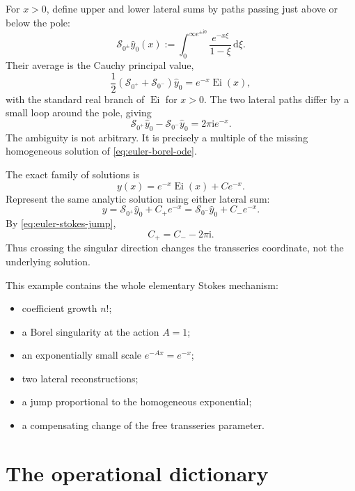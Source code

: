 \documentclass[11pt,openany]{book}
\theoremstyle{definition}
\theoremstyle{plain}
\theoremstyle{remark}
\newcommand{\dd}{\,\mathrm{d}}
\newcommand{\ii}{\mathrm{i}}
\newcommand{\trans}[1]{\widehat{#1}}
\DeclareMathOperator{\Ei}{Ei}
\newcommand{\lateralsum}[1]{\mathcal{S}_{#1}}
\begin{document}
For $x>0$, define upper and lower lateral sums by paths passing just above or below the pole:
\begin{equation}\label{eq:euler-lateral-sums}
 \lateralsum{0^\pm}\trans y_0(x)
 :=\int_0^{\infty e^{\pm\ii0}}
 \frac{e^{-x\xi}}{1-\xi}\dd\xi.
\end{equation}
Their average is the Cauchy principal value,
\begin{equation}\label{eq:euler-principal-value}
 \frac12\left(\lateralsum{0^+}+\lateralsum{0^-}\right)\trans y_0
 =e^{-x}\Ei(x),
\end{equation}
with the standard real branch of $\Ei$ for $x>0$. The two lateral paths differ by a small loop around the pole, giving
\begin{equation}\label{eq:euler-stokes-jump}
 \lateralsum{0^+}\trans y_0-
 \lateralsum{0^-}\trans y_0
 =2\pi\ii e^{-x}.
\end{equation}
The ambiguity is not arbitrary. It is precisely a multiple of the missing homogeneous solution of \eqref{eq:euler-borel-ode}.

\begin{workedbox}
The exact family of solutions is
\[
 y(x)=e^{-x}\Ei(x)+Ce^{-x}.
\]
Represent the same analytic solution using either lateral sum:
\[
 y=\lateralsum{0^+}\trans y_0+C_+e^{-x}
  =\lateralsum{0^-}\trans y_0+C_-e^{-x}.
\]
By \eqref{eq:euler-stokes-jump},
\[
 C_+=C_--2\pi\ii.
\]
Thus crossing the singular direction changes the transseries coordinate, not the underlying solution.
\end{workedbox}

This example contains the whole elementary Stokes mechanism:
\begin{itemize}
 \item coefficient growth $n!$;
 \item a Borel singularity at the action $A=1$;
 \item an exponentially small scale $e^{-Ax}=e^{-x}$;
 \item two lateral reconstructions;
 \item a jump proportional to the homogeneous exponential;
 \item a compensating change of the free transseries parameter.
\end{itemize}

\section{The operational dictionary}
\end{document}
